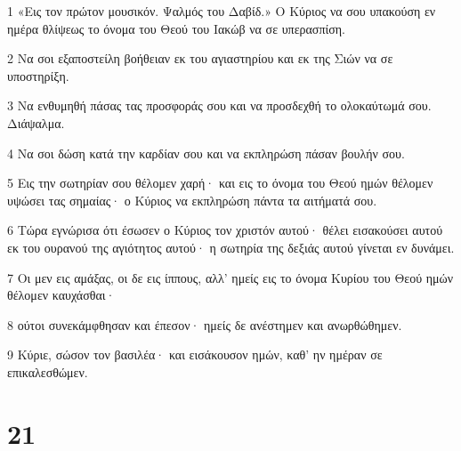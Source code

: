 \par 1 «Εις τον πρώτον μουσικόν. Ψαλμός του Δαβίδ.» Ο Κύριος να σου υπακούση εν ημέρα θλίψεως το όνομα του Θεού του Ιακώβ να σε υπερασπίση.
\par 2 Να σοι εξαποστείλη βοήθειαν εκ του αγιαστηρίου και εκ της Σιών να σε υποστηρίξη.
\par 3 Να ενθυμηθή πάσας τας προσφοράς σου και να προσδεχθή το ολοκαύτωμά σου. Διάψαλμα.
\par 4 Να σοι δώση κατά την καρδίαν σου και να εκπληρώση πάσαν βουλήν σου.
\par 5 Εις την σωτηρίαν σου θέλομεν χαρή· και εις το όνομα του Θεού ημών θέλομεν υψώσει τας σημαίας· ο Κύριος να εκπληρώση πάντα τα αιτήματά σου.
\par 6 Τώρα εγνώρισα ότι έσωσεν ο Κύριος τον χριστόν αυτού· θέλει εισακούσει αυτού εκ του ουρανού της αγιότητος αυτού· η σωτηρία της δεξιάς αυτού γίνεται εν δυνάμει.
\par 7 Οι μεν εις αμάξας, οι δε εις ίππους, αλλ' ημείς εις το όνομα Κυρίου του Θεού ημών θέλομεν καυχάσθαι·
\par 8 ούτοι συνεκάμφθησαν και έπεσον· ημείς δε ανέστημεν και ανωρθώθημεν.
\par 9 Κύριε, σώσον τον βασιλέα· και εισάκουσον ημών, καθ' ην ημέραν σε επικαλεσθώμεν.

\chapter{21}

